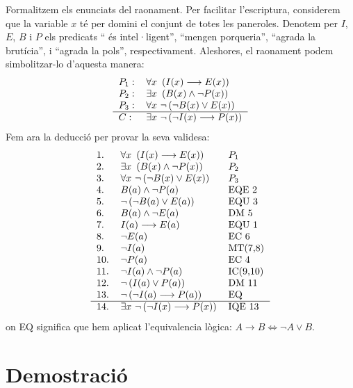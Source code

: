 \begin{solucio}
Formalitzem els enunciats del raonament. Per facilitar l'escriptura,
considerem que la variable $x$ té per domini el conjunt de totes les
paneroles. Denotem per $I$, $E$, $B$ i $P$ els predicats \enquote{%
és intel·ligent}, \enquote{mengen porqueria}, \enquote{agrada la
brutícia}, i \enquote{agrada la
pols}, respectivament. Aleshores, el raonament podem
simbolitzar-lo d'aquesta manera:%
\[%
\begin{tabular}
[c]{ll}%
$P_{1}:$ & $\forall x~\left(  I(x)\longrightarrow E(x)\right)  $\\
$P_{2}:$ & $\exists x~\left(  B(x)\wedge\lnot P(x)\right)  $\\
$P_{3}:$ & $\forall x~\lnot\left(  \lnot B(x)\vee E(x)\right)  $\\\hline
$C:$ & $\exists x~\lnot\left(  \lnot I(x)\longrightarrow P(x)\right)  $%
\end{tabular}
\]
Fem ara la deducció per provar la seva validesa:%
\[%
\begin{tabular}
[c]{lll}%
1. & $\forall x~\left(  I(x)\longrightarrow E(x)\right)  $ & $P_{1}$\\
2. & $\exists x~\left(  B(x)\wedge\lnot P(x)\right)  $ & $P_{2}$\\
3. & $\forall x~\lnot\left(  \lnot B(x)\vee E(x)\right)  $ & $P_{3}$\\
4. & $B(a)\wedge\lnot P(a)$ & EQE 2\\
5. & $\lnot\left(  \lnot B(a)\vee E(a)\right)  $ & EQU 3\\
6. & $B(a)\wedge\lnot E(a)$ & DM 5\\
7. & $I(a)\longrightarrow E(a)$ & EQU 1\\
8. & $\lnot E(a)$ & EC 6\\
9. & $\lnot I(a)$ & MT(7,8)\\
10. & $\lnot P(a)$ & EC 4\\
11. & $\lnot I(a)\wedge\lnot P(a)$ & IC(9,10)\\
12. & $\lnot\left(  I(a)\vee P(a)\right)  $ & DM 11\\
13. & $\lnot\left(  \lnot I(a)\longrightarrow P(a)\right)  $ & EQ\\\hline
14. & $\exists x~\lnot\left(  \lnot I(x)\longrightarrow P(x)\right)  $ & IQE
13
\end{tabular}
\]
on EQ significa que hem aplicat l'equivalencia lògica: $A\longrightarrow
B\Longleftrightarrow\lnot A\vee B$.
\end{solucio}

\section{Demostració}

